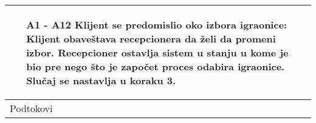 \documentclass[../../main.tex]{subfiles}
\begin{document}
\begin{longtable}{| p{} | p{} |}
\begin{itemize}
        \item [A1 - A12] Klijent se predomislio oko izbora igraonice: Klijent obaveštava recepcionera da želi da promeni izbor. Recepcioner ostavlja sistem u stanju u kome je bio pre nego što je započet proces odabira igraonice. Slučaj se nastavlja u koraku 3.
    \end{itemize} \\
\hline
    Podtokovi & %
 

\end{longtable}
\end{document}
